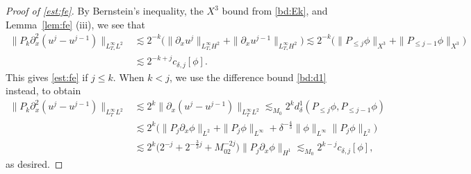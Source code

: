 \documentclass{amsart}
\numberwithin{equation}{section}
\begin{document}
\begin{proof}[Proof of \eqref{est:fe}]
By Bernstein's inequality, the $X^3$ bound from \eqref{bd:Ek}, and Lemma~\ref{lem:fe} (iii), we see that 
\begin{align*}
\| P_k\partial_x^2(u^j-u^{j-1})\|_{L^\infty_{T_*}L^2}&\lesssim 2^{-k}\big( \| \partial_xu^j\|_{L^\infty_{T_*}H^2}+ \| \partial_xu^{j-1}\|_{L^\infty_{T_*}H^2}\big) \lesssim 2^{-k}\big( \| P_{\leq j}\phi\|_{X^3}+\| P_{\leq j-1}\phi\|_{X^3}\big)  \\
&\lesssim 2^{-k+j}c_{\delta,j}[\phi] .
\end{align*}
This gives \eqref{est:fe} if $j\leq k$.
When $k<j$, we use the difference bound \eqref{bd:d1} instead, to obtain
\begin{align*}
\| P_k\partial_x^2(u^j-u^{j-1})\|_{L^\infty_TL^2}&\lesssim 2^k\| \partial_x(u^j-u^{j-1})\|_{L^\infty_TL^2}\lesssim_{M_0} 2^k d^1_\delta (P_{\leq j}\phi,P_{\leq j-1}\phi) \\
&\lesssim 2^k\big( \| P_j\partial_x\phi\|_{L^2}+\| P_j\phi\|_{L^\infty}+\delta^{-\frac43}\| \phi\|_{L^\infty}\| P_j\phi\|_{L^2}\big)  \\
&\lesssim 2^k\big( 2^{-j}+2^{-\frac32j}+M_02^{-2j}\big) \| P_j\partial_x\phi\|_{H^1} \lesssim_{M_0} 2^{k-j}c_{\delta,j}[\phi],
\end{align*}
as desired.
\end{proof}







\end{document}

